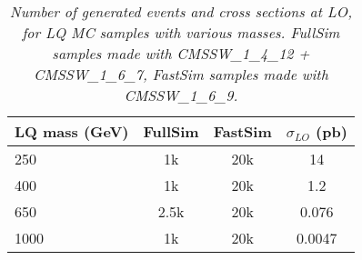 \documentclass[colclass=cmspaper]{combine}
\begin{document}
\begin{linenumbers}
%
\begin{table}[htb]
  \label{tab:NumEvents}
  \begin{center}
    \begin{tabular}{|l|ccc|} \hline
      LQ mass (GeV) & FullSim & FastSim & $\sigma_{LO}$ (pb) \\ \hline
      250  & 1k  &  20k & 14 \\
      400  & 1k  &  20k & 1.2 \\
      650  & 2.5k &  20k & 0.076 \\
      1000 & 1k  &  20k & 0.0047 \\
      \hline
    \end{tabular}
    \caption{\small \sl Number of generated events and cross sections at LO, for LQ MC samples with various masses.  
      FullSim samples made with CMSSW\_1\_4\_12 + CMSSW\_1\_6\_7, FastSim samples made with CMSSW\_1\_6\_9.}
  \end{center}
\end{table}

 



\end{linenumbers}
\end{document}
